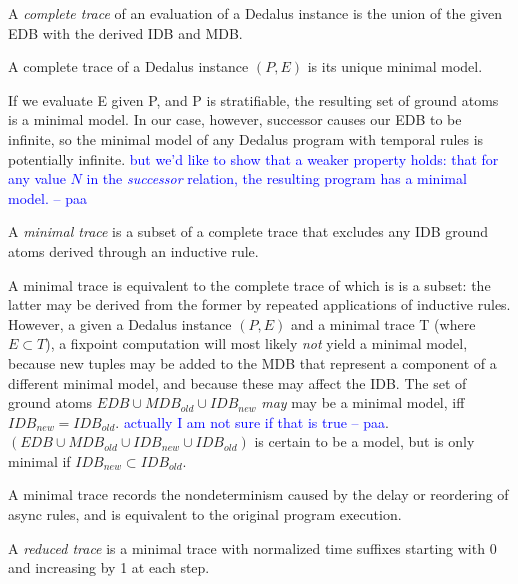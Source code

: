\documentclass{acm_proc_article-sp-sigmod09}
\newcommand{\paa}[1]{{\textcolor{blue}{#1 -- paa}}}
\newcommand{\wrm}[1]{{\color{BurntOrange}{#1 -- wrm}}}
\begin{document}
\begin{definition}
%
A \emph{complete trace} of an evaluation of a Dedalus instance is the union of
the given EDB with the derived IDB and MDB.
%
\end{definition}

\begin{lemma}
%
A complete trace of a Dedalus instance $(P,E)$ is its unique minimal model.
%
\end{lemma}

\wrm{===stopped here due to wanting some sleep.  i'll look at this again tomorrow===}

If we evaluate E given P, and P is stratifiable, the resulting set of ground atoms is a minimal model.
In our case, however, successor causes our EDB to be infinite, so the minimal model of any Dedalus program 
with temporal rules is potentially infinite.  \paa{but we'd like to show that a weaker property holds: that for any value $N$
in the \emph{successor} relation, the resulting program has a minimal model.}

\begin{definition}
A \emph{minimal trace} is a subset of a complete trace that excludes any IDB ground atoms derived through an inductive
rule.
\end{definition}

A minimal trace is equivalent to the complete trace of which is is a subset: the latter may be derived from the former by repeated
applications of inductive rules.  However, a given a Dedalus instance $(P, E)$ and a minimal trace T (where $E \subset T$), a fixpoint
computation will most likely \emph{not} yield a minimal model, because new tuples may be added to the MDB that represent a component 
of a different minimal model, and because these may affect the IDB.  The set of ground atoms $EDB \cup MDB_{old} \cup IDB_{new}$
\emph{may} may be a minimal model, iff $IDB_{new} = IDB_{old}$.  \paa{actually I am not sure if that is true}.  
$(EDB \cup MDB_{old} \cup IDB_{new} \cup IDB_{old})$ is certain to be a model, but is only minimal if $IDB_{new} \subset IDB_{old}$.

A minimal trace records the nondeterminism caused by the delay or reordering of async rules, and
is equivalent to the original program execution.  

\begin{definition}
A \emph{reduced trace} is a minimal trace with normalized time suffixes starting with 0 and increasing by 1 at each step.
\end{definition}
\end{document}
